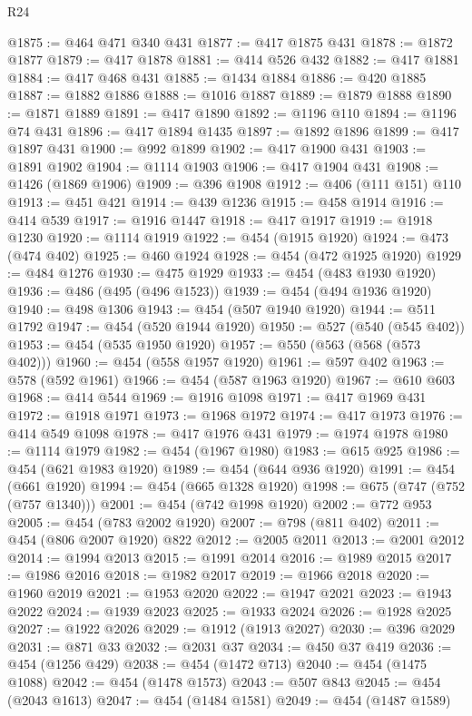 \begin{lexlean}{R24}
\begin{coremodule}
@1875 := @464 @471 @340 @431
@1877 := @417 @1875 @431
@1878 := @1872 @1877
@1879 := @417 @1878
@1881 := @414 @526 @432
@1882 := @417 @1881
@1884 := @417 @468 @431
@1885 := @1434 @1884
@1886 := @420 @1885
@1887 := @1882 @1886
@1888 := @1016 @1887
@1889 := @1879 @1888
@1890 := @1871 @1889
@1891 := @417 @1890
@1892 := @1196 @110
@1894 := @1196 @74 @431
@1896 := @417 @1894 @1435
@1897 := @1892 @1896
@1899 := @417 @1897 @431
@1900 := @992 @1899
@1902 := @417 @1900 @431
@1903 := @1891 @1902
@1904 := @1114 @1903
@1906 := @417 @1904 @431
@1908 := @1426 (@1869 @1906)
@1909 := @396 @1908
@1912 := @406 (@111 @151) @110
@1913 := @451 @421
@1914 := @439 @1236
@1915 := @458 @1914
@1916 := @414 @539
@1917 := @1916 @1447
@1918 := @417 @1917
@1919 := @1918 @1230
@1920 := @1114 @1919
@1922 := @454 (@1915 @1920)
@1924 := @473 (@474 @402)
@1925 := @460 @1924
@1928 := @454 (@472 @1925 @1920)
@1929 := @484 @1276
@1930 := @475 @1929
@1933 := @454 (@483 @1930 @1920)
@1936 := @486 (@495 (@496 @1523))
@1939 := @454 (@494 @1936 @1920)
@1940 := @498 @1306
@1943 := @454 (@507 @1940 @1920)
@1944 := @511 @1792
@1947 := @454 (@520 @1944 @1920)
@1950 := @527 (@540 (@545 @402))
@1953 := @454 (@535 @1950 @1920)
@1957 := @550 (@563 (@568 (@573 @402)))
@1960 := @454 (@558 @1957 @1920)
@1961 := @597 @402
@1963 := @578 (@592 @1961)
@1966 := @454 (@587 @1963 @1920)
@1967 := @610 @603
@1968 := @414 @544
@1969 := @1916 @1098
@1971 := @417 @1969 @431
@1972 := @1918 @1971
@1973 := @1968 @1972
@1974 := @417 @1973
@1976 := @414 @549 @1098
@1978 := @417 @1976 @431
@1979 := @1974 @1978
@1980 := @1114 @1979
@1982 := @454 (@1967 @1980)
@1983 := @615 @925
@1986 := @454 (@621 @1983 @1920)
@1989 := @454 (@644 @936 @1920)
@1991 := @454 (@661 @1920)
@1994 := @454 (@665 @1328 @1920)
@1998 := @675 (@747 (@752 (@757 @1340)))
@2001 := @454 (@742 @1998 @1920)
@2002 := @772 @953
@2005 := @454 (@783 @2002 @1920)
@2007 := @798 (@811 @402)
@2011 := @454 (@806 @2007 @1920) @822
@2012 := @2005 @2011
@2013 := @2001 @2012
@2014 := @1994 @2013
@2015 := @1991 @2014
@2016 := @1989 @2015
@2017 := @1986 @2016
@2018 := @1982 @2017
@2019 := @1966 @2018
@2020 := @1960 @2019
@2021 := @1953 @2020
@2022 := @1947 @2021
@2023 := @1943 @2022
@2024 := @1939 @2023
@2025 := @1933 @2024
@2026 := @1928 @2025
@2027 := @1922 @2026
@2029 := @1912 (@1913 @2027)
@2030 := @396 @2029
@2031 := @871 @33
@2032 := @2031 @37
@2034 := @450 @37 @419
@2036 := @454 (@1256 @429)
@2038 := @454 (@1472 @713)
@2040 := @454 (@1475 @1088)
@2042 := @454 (@1478 @1573)
@2043 := @507 @843
@2045 := @454 (@2043 @1613)
@2047 := @454 (@1484 @1581)
@2049 := @454 (@1487 @1589)

\end{coremodule}
\end{lexlean}
